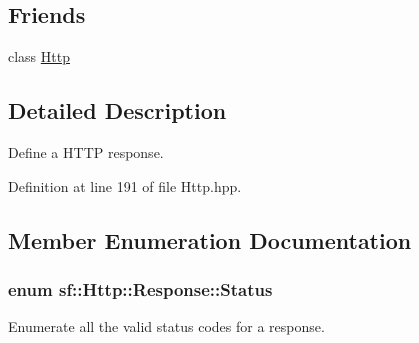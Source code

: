 \subsection*{Friends}
\begin{DoxyCompactItemize}
\item 
class \hyperlink{classsf_1_1_http_1_1_response_aba95e2a7762bb5df986048b05d03a22e}{Http}
\end{DoxyCompactItemize}


\subsection{Detailed Description}
Define a H\-T\-T\-P response. 

Definition at line 191 of file Http.\-hpp.



\subsection{Member Enumeration Documentation}
\hypertarget{classsf_1_1_http_1_1_response_a663e071978e30fbbeb20ed045be874d8}{
\subsubsection[{Status}]{\setlength{\rightskip}{0pt plus 5cm}enum {\bf sf\-::\-Http\-::\-Response\-::\-Status}}}\label{classsf_1_1_http_1_1_response_a663e071978e30fbbeb20ed045be874d8}


Enumerate all the valid status codes for a response. 

